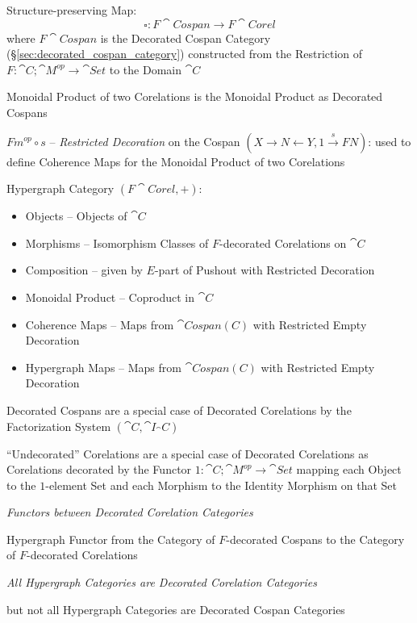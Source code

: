 Structure-preserving Map:
\[
  \square : F\cat{Cospan} \rightarrow F\cat{Corel}
\]
where $F\cat{Cospan}$ is the Decorated Cospan Category
(\S\ref{sec:decorated_cospan_category}) constructed from the
Restriction of $F : \cat{C};\cat{M}^{op} \rightarrow \cat{Set}$ to the
Domain $\cat{C}$

Monoidal Product of two Corelations is the Monoidal Product as
Decorated Cospans

$F m^{op} \circ s$ -- \emph{Restricted Decoration} on the Cospan $(X
\rightarrow N \leftarrow Y, 1 \xrightarrow{s} F N)$: used to define
Coherence Maps for the Monoidal Product of two Corelations

Hypergraph Category $(F\cat{Corel}, +)$:
\begin{itemize}
  \item Objects -- Objects of $\cat{C}$
  \item Morphisms -- Isomorphism Classes of $F$-decorated Corelations
    on $\cat{C}$
  \item Composition -- given by $E$-part of Pushout with Restricted
    Decoration %
  \item Monoidal Product -- Coproduct in $\cat{C}$
  \item Coherence Maps -- Maps from $\cat{Cospan(C)}$ with Restricted
    Empty Decoration
  \item Hypergraph Maps -- Maps from $\cat{Cospan(C)}$ with Restricted
    Empty Decoration
\end{itemize}

Decorated Cospans are a special case of Decorated Corelations by the
Factorization System $(\cat{C},\cat{I}_\cat{C})$ %

``Undecorated'' Corelations are a special case of Decorated
Corelations as Corelations decorated by the Functor $1 :
\cat{C};\cat{M}^{op} \rightarrow \cat{Set}$ mapping each Object to the
$1$-element Set and each Morphism to the Identity Morphism on that Set


\emph{Functors between Decorated Corelation Categories} %

Hypergraph Functor from the Category of $F$-decorated Cospans to the
Category of $F$-decorated Corelations


\emph{All Hypergraph Categories are Decorated Corelation Categories}

but not all Hypergraph Categories are Decorated Cospan Categories




